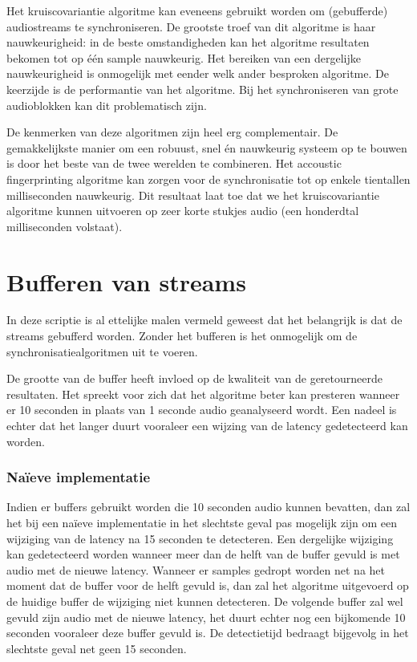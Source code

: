 Het kruiscovariantie algoritme kan eveneens gebruikt worden om (gebufferde) audiostreams te synchroniseren. De grootste troef van dit algoritme is haar nauwkeurigheid: in de beste omstandigheden kan het algoritme resultaten bekomen tot op één sample nauwkeurig. Het bereiken van een dergelijke nauwkeurigheid is onmogelijk met eender welk ander besproken algoritme. De keerzijde is de performantie van het algoritme. Bij het synchroniseren van grote audioblokken kan dit problematisch zijn.

De kenmerken van deze algoritmen zijn heel erg complementair. De gemakkelijkste manier om een robuust, snel én nauwkeurig systeem op te bouwen is door het beste van de twee werelden te combineren. Het accoustic fingerprinting algoritme kan zorgen voor de synchronisatie tot op enkele tientallen milliseconden nauwkeurig. Dit resultaat laat toe dat we het kruiscovariantie algoritme kunnen uitvoeren op zeer korte stukjes audio (een honderdtal milliseconden volstaat).

\section{Bufferen van streams}

In deze scriptie is al ettelijke malen vermeld geweest dat het belangrijk is dat de streams gebufferd worden. Zonder het bufferen is het onmogelijk om de synchronisatiealgoritmen uit te voeren. 

De grootte van de buffer heeft invloed op de kwaliteit van de geretourneerde resultaten. Het spreekt voor zich dat het algoritme beter kan presteren wanneer er 10 seconden in plaats van 1 seconde audio geanalyseerd wordt. Een nadeel is echter dat het langer duurt vooraleer een wijzing van de latency gedetecteerd kan worden. 

\subsubsection{Naïeve implementatie}

Indien er buffers gebruikt worden die 10 seconden audio kunnen bevatten, dan zal het bij een naïeve implementatie in het slechtste geval pas mogelijk zijn om een wijziging van de latency na 15 seconden te detecteren. Een dergelijke wijziging kan gedetecteerd worden wanneer meer dan de helft van de buffer gevuld is met audio met de nieuwe latency. Wanneer er samples gedropt worden net na het moment dat de buffer voor de helft gevuld is, dan zal het algoritme uitgevoerd op de huidige buffer de wijziging niet kunnen detecteren. De volgende buffer zal wel gevuld zijn audio met de nieuwe latency, het duurt echter nog een bijkomende 10 seconden vooraleer deze buffer gevuld is. De detectietijd bedraagt bijgevolg in het slechtste geval net geen 15 seconden.

